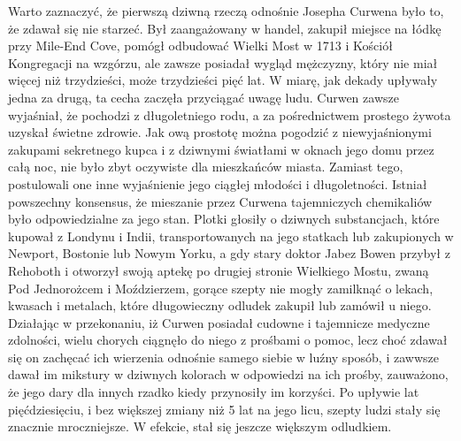 Warto zaznaczyć, że pierwszą dziwną rzeczą odnośnie Josepha Curwena było to, że zdawał się nie starzeć. Był zaangażowany w handel, zakupił miejsce na łódkę przy Mile-End Cove, pomógł odbudować Wielki Most w 1713 i Kościół Kongregacji na wzgórzu, ale zawsze posiadał wygląd mężczyzny, który nie miał więcej niż trzydzieści, może trzydzieści pięć lat. W miarę, jak dekady upływały jedna za drugą, ta cecha zaczęła przyciągać uwagę ludu. Curwen zawsze wyjaśniał, że pochodzi z długoletniego rodu, a za pośrednictwem prostego żywota uzyskał świetne zdrowie. Jak ową prostotę można pogodzić z niewyjaśnionymi zakupami sekretnego kupca i z dziwnymi światłami w oknach jego domu przez całą noc, nie było zbyt oczywiste dla mieszkańców miasta. Zamiast tego, postulowali one inne wyjaśnienie jego ciągłej młodości i długoletności. Istniał powszechny konsensus, że mieszanie przez Curwena tajemniczych chemikaliów było odpowiedzialne za jego stan. Plotki głosiły o dziwnych substancjach, które kupował z Londynu i Indii, transportowanych na jego statkach lub zakupionych w Newport, Bostonie lub Nowym Yorku, a gdy stary doktor Jabez Bowen przybył z Rehoboth i otworzył swoją aptekę po drugiej stronie Wielkiego Mostu, zwaną Pod Jednorożcem i Moździerzem, gorące szepty nie mogły zamilknąć o lekach, kwasach i metalach, które długowieczny odludek zakupił lub zamówił u niego. Działając w przekonaniu, iż Curwen posiadał cudowne i tajemnicze medyczne zdolności, wielu chorych ciągnęło do niego z prośbami o pomoc, lecz choć zdawał się on zachęcać ich wierzenia odnośnie samego siebie w luźny sposób, i zawwsze dawał im mikstury w dziwnych kolorach w odpowiedzi na ich prośby, zauważono, że jego dary dla innych rzadko kiedy przynosiły im korzyści. Po upływie lat pięćdziesięciu, i bez większej zmiany niż 5 lat na jego licu, szepty ludzi stały się znacznie mroczniejsze. W efekcie, stał się jeszcze większym odludkiem.

